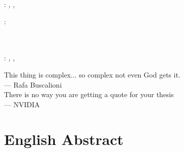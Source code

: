 \documentclass[ twoside,openright,titlepage,numbers=noenddot,%
headinclude,footinclude,cleardoublepage=empty,abstract=on,
BCOR=5mm,paper=b5,fontsize=11pt, dvipsnames
]{scrreprt}
\begin{document}
\thispagestyle{empty}

\hfill

\vfill

\noindent\myName: \textit{\myTitle,} \mySubtitle, %
\textcopyright\ \myTime

\bigskip

\noindent{}: \\
\myProf \\
\myOtherProf \\
\mySupervisor

%
%
%

\thispagestyle{empty}

\hfill

\vfill

\noindent\myName: \textit{\myTitle,} \mySubtitle, %
\textcopyright\ \myTime

\cleardoublepage
\thispagestyle{empty}

\vspace*{3cm}

\begin{center}
      This thing is complex... so complex not even God gets it.\\ \medskip
    --- Rafa Buscalioni
    \\ \medskip\medskip
        There is no way you are getting a quote for your thesis\\ \medskip
    --- NVIDIA

\end{center}

\medskip

\cleardoublepage
\begingroup
\let\cleardoublepage\relax
\let\cleardoublepage\relax
\let\cleardoublepage\relax

\chapter*{English Abstract}
\end{document}
